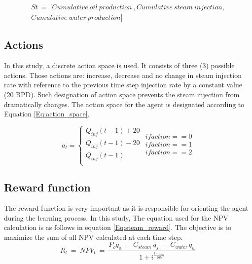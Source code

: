\begin{equation}\label{Eq:steam_state}
\begin{split}
St\ =\ [Cumulative\ oil\ production\ ,Cumulative\ steam\ injection,\\ Cumulative\ water\ production]    
\end{split}
\end{equation}

\subsection{Actions}
In this study, a discrete action space is used. It consists of three (3) possible actions. Those actions are: increase, decrease and no change in steam injection rate with reference to the previous time step injection rate by a constant value (20 BPD). Such designation of action space prevents the steam injection from dramatically changes.
The action space for the agent is designated according to Equation \ref{Eq:action_space}.

\begin{equation}\label{Eq:action_space}
    a_t =
    \begin{cases}
        Q_{inj}(t-1) + 20 \\[0.5ex]
        Q_{inj}(t-1) - 20 \\[0.5ex]
        Q_{inj}(t-1) \\[0.5ex]
    \end{cases}
    \begin{aligned}
        if action == 0 \\[0.5ex]
        if action == 1 \\[0.5ex]
        if action == 2 \\[0.5ex]
    \end{aligned}
\end{equation}

\subsection{Reward function}
The reward function is very important as it is responsible for orienting the agent during the learning process. In this study, The equation used for the NPV calculation is as follows in equation \ref{Eq:steam_reward}. The objective is to maximize the sum of all NPV calculated at each time step.
\begin{equation}\label{Eq:steam_reward}
    R_t\ =\ {NPV}_t\ =\ \frac{P_oq_o\ -\ C_{steam}\ q_s\ -\ C_{water\ }q_w}{1+i^\frac{t-t_{ref}}{365}}					
\end{equation}

